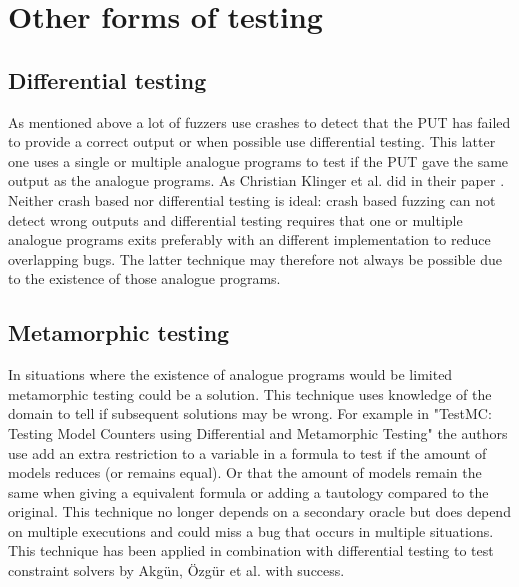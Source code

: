 \section{Other forms of testing}
\subsection{Differential testing}
\label{fuzzing:DifferentialTesting}
As mentioned above a lot of fuzzers use crashes to detect that the PUT has failed to provide a correct output or when possible use differential testing. This latter one uses a single or multiple analogue programs to test if the PUT gave the same output as the analogue programs. As Christian Klinger et al. did in their paper \cite{48klinger2019differentially}. Neither crash based nor differential testing is ideal: crash based fuzzing can not detect wrong outputs and differential testing requires that one or multiple analogue programs exits preferably with an different implementation to reduce overlapping bugs. The latter technique may therefore not always be possible due to the existence of those analogue programs.

\subsection{Metamorphic testing}
\label{fuzzing:MetamorphicTesting}
In situations where the existence of analogue programs would be limited metamorphic testing could be a solution. This technique uses knowledge of the domain to tell if subsequent solutions may be wrong. For example in "TestMC: Testing Model Counters using Differential and Metamorphic Testing" \cite{49usman2020testmc} the authors use add an extra restriction to a variable in a formula to test if the amount of models reduces (or remains equal). Or that the amount of models remain the same when giving a equivalent formula or adding a tautology compared to the original. This technique no longer depends on a secondary oracle but does depend on multiple executions and could miss a bug that occurs in multiple situations. This technique has been applied in combination with differential testing to test constraint solvers \cite{50akgun2018metamorphic} by Akg{\"u}n, {\"O}zg{\"u}r et al. with success. 


